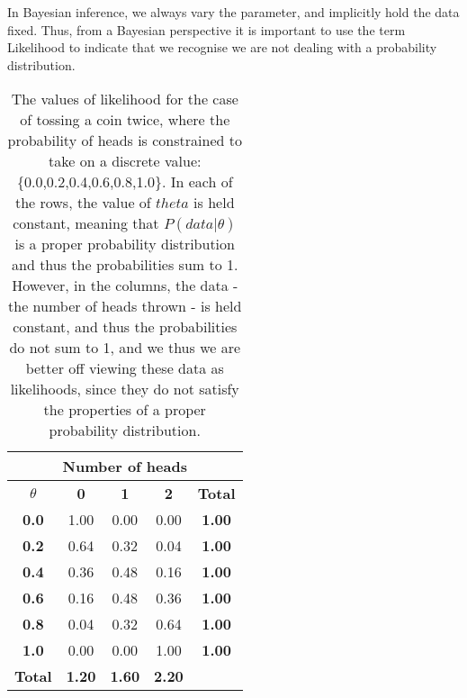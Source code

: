 \documentclass[11pt,fullpage]{book}
\begin{document}
In Bayesian inference, we always vary the parameter, and implicitly hold the data fixed. Thus, from a Bayesian perspective it is important to use the term Likelihood to indicate that we recognise we are not dealing with a probability distribution.


\begin{table}[htbp]
  \centering
  
    \begin{tabular}{ccccc}
    \multicolumn{5}{c}{\textbf{Number of heads}} \\
    \midrule
    \textbf{$\theta$} & \multicolumn{1}{c}{\textbf{0}} & \multicolumn{1}{c}{\textbf{1}} & \multicolumn{1}{c}{\textbf{2}} &  \multicolumn{1}{c}{\textbf{Total}} \\
    \hline
    \textbf{0.0} & \multicolumn{1}{c}{1.00} & \multicolumn{1}{c}{0.00} & \multicolumn{1}{c}{0.00} & \multicolumn{1}{c}{\textbf{1.00}} \\
    \textbf{0.2} & \multicolumn{1}{c}{0.64} & \multicolumn{1}{c}{0.32} & \multicolumn{1}{c}{0.04} & \multicolumn{1}{c}{\textbf{1.00}} \\
    \textbf{0.4} & \multicolumn{1}{c}{0.36} & \multicolumn{1}{c}{0.48} & \multicolumn{1}{c}{0.16} & \multicolumn{1}{c}{\textbf{1.00}} \\
    \textbf{0.6} & \multicolumn{1}{c}{0.16} & \multicolumn{1}{c}{0.48} & \multicolumn{1}{c}{0.36} & \multicolumn{1}{c}{\textbf{1.00}} \\
    \textbf{0.8} & \multicolumn{1}{c}{0.04} & \multicolumn{1}{c}{0.32} & \multicolumn{1}{c}{0.64} & \multicolumn{1}{c}{\textbf{1.00}} \\
    \textbf{1.0} & \multicolumn{1}{c}{0.00} & \multicolumn{1}{c}{0.00} & \multicolumn{1}{c}{1.00} & \multicolumn{1}{c}{\textbf{1.00}} \\
    \bottomrule
    \textbf{Total} & \multicolumn{1}{c}{\textbf{1.20}} & \multicolumn{1}{c}{\textbf{1.60}} & \multicolumn{1}{c}{\textbf{2.20}} &  \\
    
    \end{tabular}%
  \label{tab:Likeihood_BayesBox}%
  \caption{The values of likelihood for the case of tossing a coin twice, where the probability of heads is constrained to take on a discrete value: \{0.0,0.2,0.4,0.6,0.8,1.0\}. In each of the rows, the value of $theta$ is held constant, meaning that $P(data|\theta)$ is a proper probability distribution and thus the probabilities sum to 1. However, in the columns, the data - the number of heads thrown - is held constant, and thus the probabilities do not sum to 1, and we thus we are better off viewing these data as likelihoods, since they do not satisfy the properties of a proper probability distribution.}
\end{table}%
\end{document}
